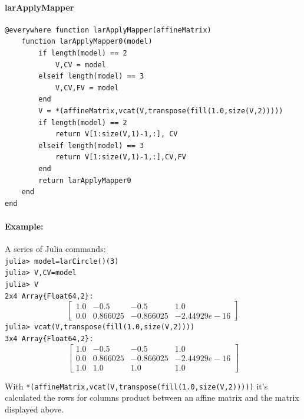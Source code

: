 \documentclass{article}
\begin{document}
\paragraph{larApplyMapper}

\begin{verbatim}
@everywhere function larApplyMapper(affineMatrix)
    function larApplyMapper0(model)
        if length(model) == 2 
            V,CV = model
        elseif length(model) == 3
            V,CV,FV = model 
        end
        V = *(affineMatrix,vcat(V,transpose(fill(1.0,size(V,2)))))
        if length(model) == 2 
            return V[1:size(V,1)-1,:], CV
        elseif length(model) == 3
            return V[1:size(V,1)-1,:],CV,FV 
        end
        return larApplyMapper0
    end
end
\end{verbatim}

\paragraph{Example:} A series of Julia commands:\\
\verb!julia> model=larCircle()(3)!\\
\verb!julia> V,CV=model!\\
\verb!julia> V!\\
\verb!2x4 Array{Float64,2}:!
\[
\begin{bmatrix}
1.0 & -0.5 & -0.5 & 1.0 \\
0.0 & 0.866025 & -0.866025 & -2.44929e-16
\end{bmatrix}
\]
\verb!julia> vcat(V,transpose(fill(1.0,size(V,2))))!\\
\verb!3x4 Array{Float64,2}:!
\[
\begin{bmatrix}
1.0 & -0.5 & -0.5 & 1.0 \\
0.0 & 0.866025 & -0.866025 & -2.44929e-16 \\
1.0 & 1.0 & 1.0 & 1.0
\end{bmatrix}
\]

With \verb!*(affineMatrix,vcat(V,transpose(fill(1.0,size(V,2)))))! it's calculated the rows for columns product between an affine matrix and the matrix displayed above.
\end{document}
